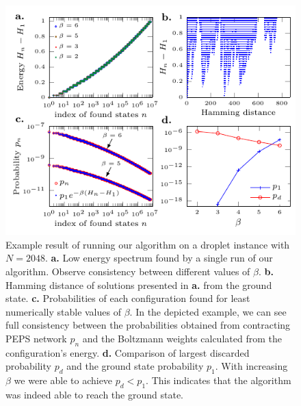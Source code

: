 \begin{figure}
  \includegraphics[width=\textwidth]{figures/tn-single-state_overlay.pdf}
  \caption{Example result of running our algorithm on a droplet instance with $N=2048$.
    \textbf{a.} Low energy spectrum found by a single run of our algorithm. Observe
    consistency between different values of $\beta$. \textbf{b.} Hamming distance
    of solutions presented in \textbf{a.} from the ground state. \textbf{c.}
    Probabilities of each configuration found for least numerically stable values
    of $\beta$. In the depicted example, we can see full consistency between the
    probabilities obtained from contracting PEPS network $p_{n}$ and the Boltzmann
    weights calculated from the configuration's energy. \textbf{d.} Comparison of
    largest discarded probability $p_{d}$ and the ground state probability $p_{1}$.
    With increasing $\beta$ we were able to achieve $p_{d} < p_{1}$. This indicates
    that the algorithm was indeed able to reach the ground state. }
  \label{fig:tn-single-state}
\end{figure}

